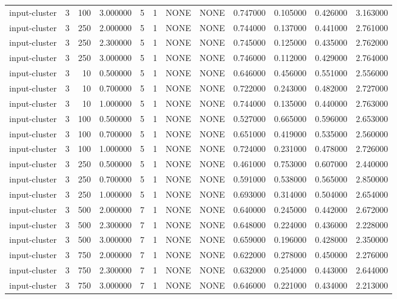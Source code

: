 \begin{tabular}{lrrrllllrrrr}
input-cluster & 3 & 100 & 3.000000 & 5 & 1 & NONE & NONE & 0.747000 & 0.105000 & 0.426000 & 3.163000 \\
input-cluster & 3 & 250 & 2.000000 & 5 & 1 & NONE & NONE & 0.744000 & 0.137000 & 0.441000 & 2.761000 \\
input-cluster & 3 & 250 & 2.300000 & 5 & 1 & NONE & NONE & 0.745000 & 0.125000 & 0.435000 & 2.762000 \\
input-cluster & 3 & 250 & 3.000000 & 5 & 1 & NONE & NONE & 0.746000 & 0.112000 & 0.429000 & 2.764000 \\
input-cluster & 3 & 10 & 0.500000 & 5 & 1 & NONE & NONE & 0.646000 & 0.456000 & 0.551000 & 2.556000 \\
input-cluster & 3 & 10 & 0.700000 & 5 & 1 & NONE & NONE & 0.722000 & 0.243000 & 0.482000 & 2.727000 \\
input-cluster & 3 & 10 & 1.000000 & 5 & 1 & NONE & NONE & 0.744000 & 0.135000 & 0.440000 & 2.763000 \\
input-cluster & 3 & 100 & 0.500000 & 5 & 1 & NONE & NONE & 0.527000 & 0.665000 & 0.596000 & 2.653000 \\
input-cluster & 3 & 100 & 0.700000 & 5 & 1 & NONE & NONE & 0.651000 & 0.419000 & 0.535000 & 2.560000 \\
input-cluster & 3 & 100 & 1.000000 & 5 & 1 & NONE & NONE & 0.724000 & 0.231000 & 0.478000 & 2.726000 \\
input-cluster & 3 & 250 & 0.500000 & 5 & 1 & NONE & NONE & 0.461000 & 0.753000 & 0.607000 & 2.440000 \\
input-cluster & 3 & 250 & 0.700000 & 5 & 1 & NONE & NONE & 0.591000 & 0.538000 & 0.565000 & 2.850000 \\
input-cluster & 3 & 250 & 1.000000 & 5 & 1 & NONE & NONE & 0.693000 & 0.314000 & 0.504000 & 2.654000 \\
input-cluster & 3 & 500 & 2.000000 & 7 & 1 & NONE & NONE & 0.640000 & 0.245000 & 0.442000 & 2.672000 \\
input-cluster & 3 & 500 & 2.300000 & 7 & 1 & NONE & NONE & 0.648000 & 0.224000 & 0.436000 & 2.228000 \\
input-cluster & 3 & 500 & 3.000000 & 7 & 1 & NONE & NONE & 0.659000 & 0.196000 & 0.428000 & 2.350000 \\
input-cluster & 3 & 750 & 2.000000 & 7 & 1 & NONE & NONE & 0.622000 & 0.278000 & 0.450000 & 2.276000 \\
input-cluster & 3 & 750 & 2.300000 & 7 & 1 & NONE & NONE & 0.632000 & 0.254000 & 0.443000 & 2.644000 \\
input-cluster & 3 & 750 & 3.000000 & 7 & 1 & NONE & NONE & 0.646000 & 0.221000 & 0.434000 & 2.213000 \\

\end{tabular}
